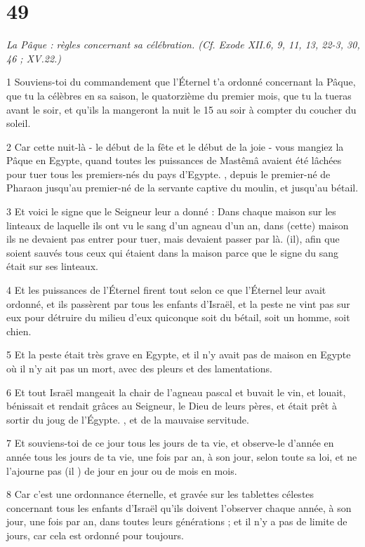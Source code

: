 \chapter{49}

\par \textit{La Pâque : règles concernant sa célébration. (Cf. Exode XII.6, 9, 11, 13, 22-3, 30, 46 ; XV.22.)}

\par 1 Souviens-toi du commandement que l'Éternel t'a ordonné concernant la Pâque, que tu la célèbres en sa saison, le quatorzième du premier mois, que tu la tueras avant le soir, et qu'ils la mangeront la nuit le 15 au soir à compter du coucher du soleil.
\par 2 Car cette nuit-là - le début de la fête et le début de la joie - vous mangiez la Pâque en Egypte, quand toutes les puissances de Mastêmâ avaient été lâchées pour tuer tous les premiers-nés du pays d'Egypte. , depuis le premier-né de Pharaon jusqu'au premier-né de la servante captive du moulin, et jusqu'au bétail.
\par 3 Et voici le signe que le Seigneur leur a donné : Dans chaque maison sur les linteaux de laquelle ils ont vu le sang d'un agneau d'un an, dans (cette) maison ils ne devaient pas entrer pour tuer, mais devaient passer par là. (il), afin que soient sauvés tous ceux qui étaient dans la maison parce que le signe du sang était sur ses linteaux.
\par 4 Et les puissances de l'Éternel firent tout selon ce que l'Éternel leur avait ordonné, et ils passèrent par tous les enfants d'Israël, et la peste ne vint pas sur eux pour détruire du milieu d'eux quiconque soit du bétail, soit un homme, soit chien.
\par 5 Et la peste était très grave en Egypte, et il n'y avait pas de maison en Egypte où il n'y ait pas un mort, avec des pleurs et des lamentations.
\par 6 Et tout Israël mangeait la chair de l'agneau pascal et buvait le vin, et louait, bénissait et rendait grâces au Seigneur, le Dieu de leurs pères, et était prêt à sortir du joug de l'Égypte. , et de la mauvaise servitude.
\par 7 Et souviens-toi de ce jour tous les jours de ta vie, et observe-le d'année en année tous les jours de ta vie, une fois par an, à son jour, selon toute sa loi, et ne l'ajourne pas (il ) de jour en jour ou de mois en mois.
\par 8 Car c'est une ordonnance éternelle, et gravée sur les tablettes célestes concernant tous les enfants d'Israël qu'ils doivent l'observer chaque année, à son jour, une fois par an, dans toutes leurs générations ; et il n'y a pas de limite de jours, car cela est ordonné pour toujours.
